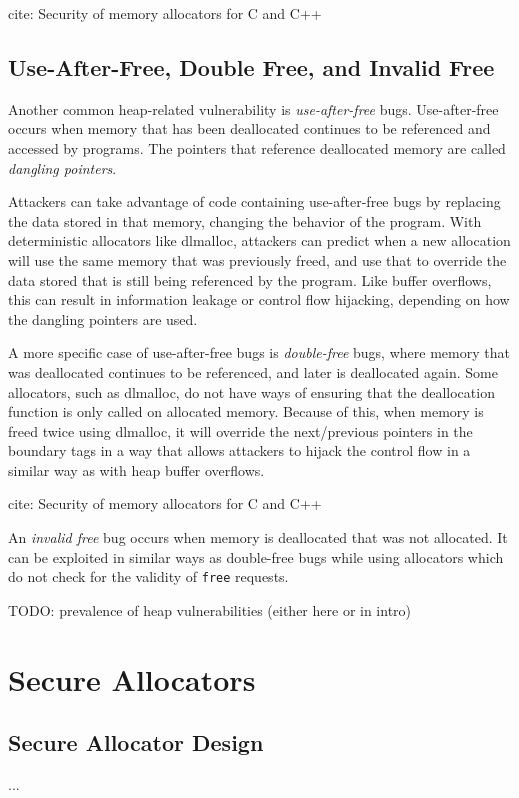 \documentclass[conference]{IEEEtran}
\begin{document}
	{\color{red} cite: Security of memory allocators for C and C++ }

\subsection{Use-After-Free, Double Free, and Invalid Free}

Another common heap-related vulnerability is \emph{use-after-free} bugs.
Use-after-free occurs when memory that has been deallocated continues to be referenced and accessed by programs.
The pointers that reference deallocated memory are called \emph{dangling pointers}.

Attackers can take advantage of code containing use-after-free bugs by replacing the data stored in that memory, changing the behavior of the program.
With deterministic allocators like dlmalloc, attackers can predict when a new allocation will use the same memory that was previously freed, and use that to override the data stored that is still being referenced by the program.
Like buffer overflows, this can result in information leakage or control flow hijacking, depending on how the dangling pointers are used.

A more specific case of use-after-free bugs is \emph{double-free} bugs, where memory that was deallocated continues to be referenced, and later is deallocated again.
Some allocators, such as dlmalloc, do not have ways of ensuring that the deallocation function is only called on allocated memory.
Because of this, when memory is freed twice using dlmalloc, it will override the next/previous pointers in the boundary tags in a way that allows attackers to hijack the control flow in a similar way as with heap buffer overflows.

	{\color{red} cite: Security of memory allocators for C and C++ }

An \emph{invalid free} bug occurs when memory is deallocated that was not allocated.
It can be exploited in similar ways as double-free bugs while using allocators which do not check for the validity of \verb|free| requests.

	{\color{red} TODO: prevalence of heap vulnerabilities (either here or in intro) }

\section{Secure Allocators}

\subsection{Secure Allocator Design}
{\color{red}...}
\end{document}
